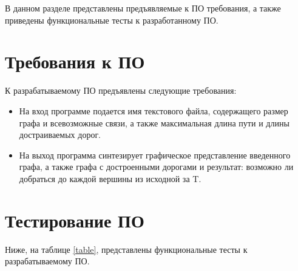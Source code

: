 В данном разделе представлены предъявляемые к ПО требования, а также приведены функциональные тесты к разработанному ПО.

\section{Требования к ПО}

К разрабатываемому ПО предъявлены следующие требования:

\begin{itemize}[$\bullet$]
    \item На вход программе подается имя текстового файла, содержащего размер графа и всевозможные связи, а также максимальная длина пути и длины достраиваемых дорог.
    \item На выход программа синтезирует графическое представление введенного графа, а также графа с достроенными дорогами и результат: возможно ли добраться до каждой вершины из исходной за T.
\end{itemize}

\section{Тестирование ПО}

Ниже, на таблице \ref{table}, представлены функциональные тесты к разрабатываемому ПО.

